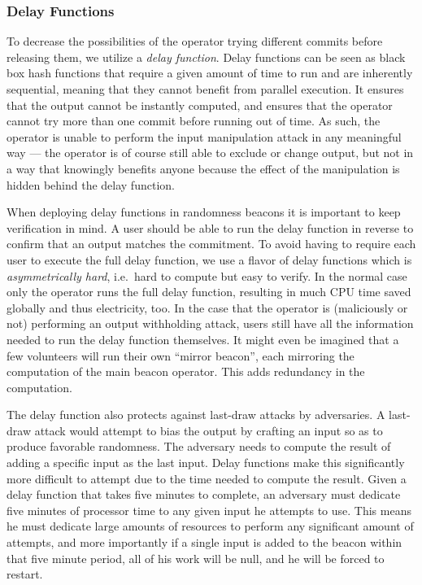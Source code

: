 \subsubsection{Delay Functions}
To decrease the possibilities of the operator trying different commits before releasing them, we utilize a \emph{delay function}.
Delay functions can be seen as black box hash functions that require a given amount of time to run and are inherently sequential, meaning that they cannot benefit from parallel execution.
It ensures that the output cannot be instantly computed, and ensures that the operator cannot try more than one commit before running out of time. As such, the operator is unable to perform the input manipulation attack in any meaningful way --- the operator is of course still able to exclude or change output, but not in a way that knowingly benefits anyone because the effect of the manipulation is hidden behind the delay function.

When deploying delay functions in randomness beacons it is important to keep verification in mind.
A user should be able to run the delay function in reverse to confirm that an output matches the commitment.
To avoid having to require each user to execute the full delay function, we use a flavor of delay functions which is \emph{asymmetrically hard}, i.e.\ hard to compute but easy to verify.
In the normal case only the operator runs the full delay function, resulting in much CPU time saved globally and thus electricity, too.
In the case that the operator is (maliciously or not) performing an output withholding attack, users still have all the information needed to run the delay function themselves.
It might even be imagined that a few volunteers will run their own \enquote{mirror beacon}, each mirroring the computation of the main beacon operator. This adds redundancy in the computation.

The delay function also protects against last-draw attacks by adversaries.
A last-draw attack would attempt to bias the output by crafting an input so as to produce favorable randomness.
The adversary needs to compute the result of adding a specific input as the last input.
Delay functions make this significantly more difficult to attempt due to the time needed to compute the result.
Given a delay function that takes five minutes to complete, an adversary must dedicate five minutes of processor time to any given input he attempts to use.
This means he must dedicate large amounts of resources to perform any significant amount of attempts, and more importantly if a single input is added to the beacon within that five minute period, all of his work will be null, and he will be forced to restart.

